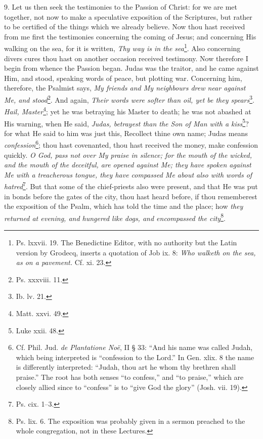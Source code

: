 9. Let us then seek the testimonies to the Passion of Christ: for we are met together, not now to make a speculative exposition of the Scriptures, but rather to be certified of the things which we already believe. Now thou hast received from me first the testimonies concerning the coming of Jesus; and concerning His walking on the sea, for it is written, \emph{Thy way is in the sea}\footnote{Ps. lxxvii. 19. The Benedictine Editor, with no authority but the Latin version by Grodecq, inserts a quotation of Job ix. 8: \emph{Who walketh on the sea, as on a pavement.} Cf. xi. 23.}. Also concerning divers cures thou hast on another occasion received testimony. Now therefore I begin from whence the Passion began. Judas was the traitor, and he came against Him, and stood, speaking words of peace, but plotting war. Concerning him, therefore, the Psalmist says, \emph{My friends and My neighbours drew near against Me, and stood}\footnote{Ps. xxxviii. 11.}. And again, \emph{Their words were softer than oil, yet be they spears}\footnote{Ib. lv. 21.}. \emph{Hail, Master}\footnote{Matt. xxvi. 49.}; yet he was betraying his Master to death; he was not abashed at His warning, when He said, \emph{Judas, betrayest than the Son of Man with a kiss}\footnote{Luke xxii. 48.}? for what He said to him was just this, Recollect thine own name; Judas means \emph{confession}\footnote{Cf. Phil. Jud. \emph{de Plantatione Noë}, II § 33: “And his name was called Judah, which being interpreted is “confession to the Lord.” In Gen. xlix. 8 the name is differently interpreted: “Judah, thou art he whom thy brethren shall praise.” The root has both senses “to confess,” and “to praise,” which are closely allied since to “confess” is to “give God the glory” (Josh. vii. 19).}; thou hast covenanted, thou hast received the money, make confession quickly. \emph{O God, pass not over My praise in silence; for the mouth of the wicked, and the mouth of the deceitful, are opened against Me; they have spoken against Me with a treacherous tongue, they have compassed Me about also with words of hatred}\footnote{Ps. cix. 1–3.}. But that some of the chief-priests also were present, and that He was put in bonds before the gates of the city, thou hast heard before, if thou rememberest the exposition of the Psalm, which has told the time and the place; how \emph{they returned at evening, and hungered like dogs, and encompassed the city}\footnote{Ps. lix. 6. The exposition was probably given in a sermon preached to the whole congregation, not in these Lectures.}.

